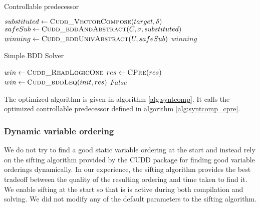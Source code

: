 \begin{algorithm}
\caption{Controllable predecessor}
\label{alg:syntcomp_cpre}

\begin{algorithmic}


    \State $substituted \gets \Call{Cudd\_VectorCompose}{target, \delta}$
    \State $safeSub     \gets \Call{Cudd\_bddAndAbstract}{C, \sigma, substituted}$
    \State $winning     \gets \Call{Cudd\_bddUnivAbstract}{U, safeSub}$
    \State \Return $winning$

\EndFunction

\end{algorithmic}
\end{algorithm}

\begin{algorithm}
\caption{Simple BDD Solver}
\label{alg:syntcomp}

\begin{algorithmic}


    \State $win \gets \Call{Cudd\_ReadLogicOne}{}$
    \Loop
        \State $res \gets \Call{CPre}{res}$
        \State $win \gets \Call{Cudd\_bddLeq}{init, res}$
            \State \Return $False$
        \EndIf
    \EndLoop

\EndFunction

\end{algorithmic}
\end{algorithm}

The optimized algorithm is given in algorithm \ref{alg:syntcomp}. It calls the optimized controllable predecessor defined in algorithm \ref{alg:syntcomp_cpre}.

\subsubsection{Dynamic variable ordering}
We do not try to find a good static variable ordering at the start and instead rely on the sifting algorithm provided by the CUDD package for finding good variable orderings dynamically. In our experience, the sifting algorithm provides the best tradeoff between the quality of the resulting ordering and time taken to find it. We enable sifting at the start so that is is active during both compilation and solving. We did not modify any of the default parameters to the sifting algorithm.

